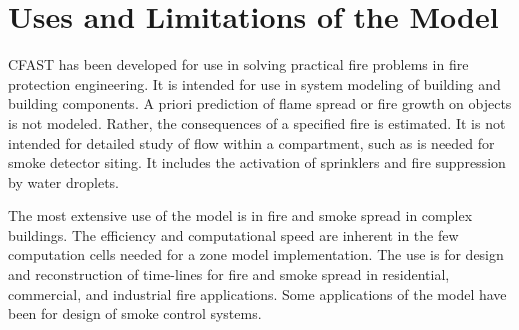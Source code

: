 \section{Uses and Limitations of the Model}
CFAST has been developed for use in solving practical fire problems in fire protection engineering.  It is intended for use in system modeling of building and building components.  A priori prediction of flame spread or fire growth on objects is not modeled. Rather, the consequences of a specified fire is estimated. It is not intended for detailed study of flow within a compartment, such as is needed for smoke detector siting.  It includes the activation of sprinklers and fire suppression by water droplets.

The most extensive use of the model is in fire and smoke spread in complex buildings.  The efficiency and computational speed are inherent in the few computation cells needed for a zone model implementation.  The use is for design and reconstruction of time-lines for fire and smoke spread in residential, commercial, and industrial fire applications.  Some applications of the model have been for design of smoke control systems.


